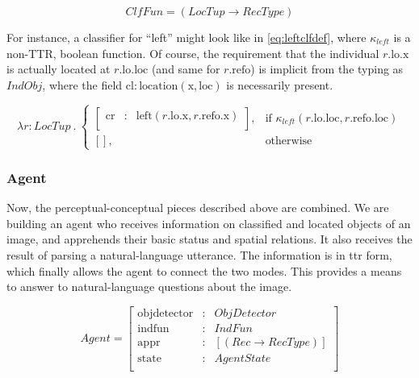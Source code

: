 \begin{equation}\label{eq:clf}
ClfFun = ( LocTup \rightarrow RecType )
\end{equation}

For instance, a classifier for ``left'' might look like in \autoref{eq:leftclfdef}, where $\kappa_{left}$ is a non-TTR, boolean function.
Of course, the requirement that the individual $r.\text{lo}.\text{x}$ is actually located at $r.\text{lo}.\text{loc}$ (and same for $r.\text{refo}$) is implicit from the typing as $IndObj$, where the field $\text{cl} : \text{location}(\text{x}, \text{loc})$ is necessarily present.

\begin{equation}\label{eq:leftclfdef}
\lambda r : LocTup \ .\ 
\begin{cases}
\left[\begin{array}{rcl}
    \text{cr} &:& \text{left}(r.\text{lo}.\text{x}, r.\text{refo}.\text{x}) \\
\end{array}\right],
& \text{if } \kappa_{left}(r.\text{lo}.\text{loc}, r.\text{refo}.\text{loc}) \\
[], & \text{otherwise}
\end{cases}
\end{equation}



\subsubsection{Agent}

Now, the perceptual-conceptual pieces described above are combined.
We are building an agent who receives information on classified and located objects of an image, and apprehends their basic status and spatial relations.
It also receives the result of parsing a natural-language utterance.
The information is in \gls{ttr} form, which finally allows the agent to connect the two modes.
This provides a means to answer to natural-language questions about the image.

\begin{equation}\label{eq:agent}
Agent = \left[\begin{array}{rcl}
    \text{objdetector} &:& ObjDetector \\
    \text{indfun} &:& IndFun \\
    \text{appr} &:& [(Rec \rightarrow RecType)] \\
    \text{state} &:& AgentState \\
    \end{array}\right]
\end{equation}

